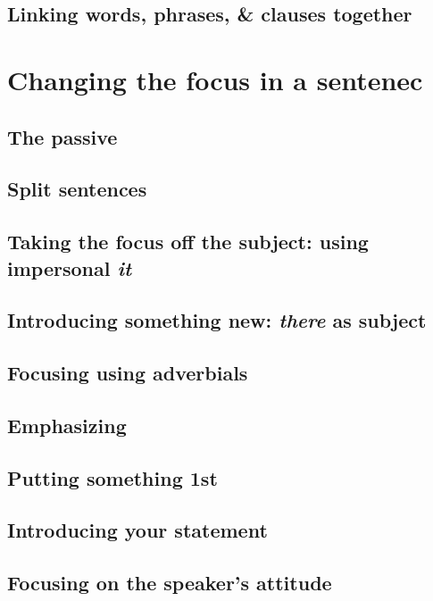 \documentclass[oneside]{book}
\numberwithin{equation}{section}
\begin{document}
\section{Linking words, phrases, \& clauses together}


\chapter{Changing the focus in a sentenec}

\section{The passive}

\section{Split sentences}

\section{Taking the focus off the subject: using impersonal \textit{it}}

\section{Introducing something new: \textit{there} as subject}

\section{Focusing using adverbials}

\section{Emphasizing}

\section{Putting something 1st}

\section{Introducing your statement}

\section{Focusing on the speaker's attitude}
\end{document}
